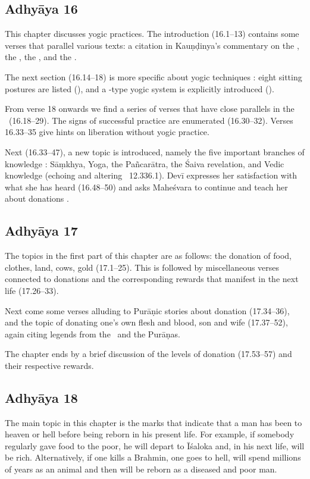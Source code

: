 \subsection*{Adhyāya 16}\label{contents_of_ch16}
This chapter discusses yogic practices. The introduction (16.1--13) contains some verses that parallel
various texts: a citation in Kauṇḍinya's commentary on the ,
the \MBh, the \BhavP, and the \AgniP.

The next section (16.14--18) is more specific about yogic techniques : 
eight sitting postures are listed (),
and a -type yogic system is explicitly introduced ().

From verse 18 onwards we find a series of verses that have close parallels in the \DharmP\ (16.18--29). The signs of 
successful practice are enumerated (16.30--32). Verses 16.33--35 give hints on liberation without yogic practice.

Next (16.33--47), a new topic is introduced, namely the five important branches of knowledge :
Sāṃkhya, Yoga, the Pañcarātra, the Śaiva revelation, and Vedic knowledge (echoing and altering \MBh\ 12.336.1).
Devī expresses her satisfaction with what she has heard (16.48--50) and asks Maheśvara to continue
and teach her about donations .


\subsection*{Adhyāya 17}\label{contents_of_ch17}
The topics in the first part of this chapter are as follows: the donation of food, clothes, land, cows, gold (17.1--25).
This is followed by miscellaneous verses connected to donations and the corresponding rewards that manifest in the next life (17.26--33).

Next come some verses alluding to Purāṇic stories about donation (17.34--36), and the topic of donating one's own flesh and blood,
son and wife (17.37--52), again citing legends from the \MBh\ and the Purāṇas. 

The chapter ends by a brief discussion of the levels of donation (17.53--57) and their respective rewards.


\subsection*{Adhyāya 18}\label{contents_of_ch18}
The main topic in this chapter is the marks that indicate that a man
has been to heaven or hell before being reborn in his present life.
For example, if somebody regularly gave food to the poor, he will
depart to Īśaloka and, in his next life, will be rich. 
Alternatively, if one kills a Brahmin, one goes to hell,
will spend millions of years as an animal and then will
be reborn as a diseased and poor man.

